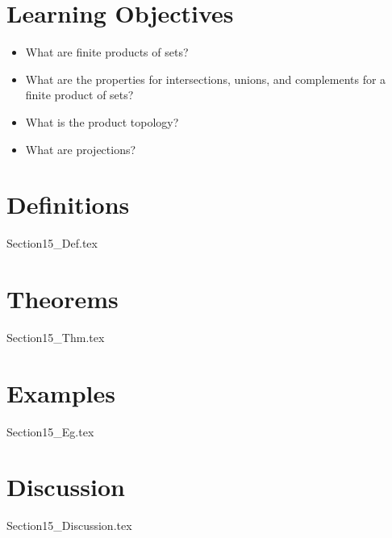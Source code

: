 \section{Learning Objectives}

\begin{itemize}
    \item What are finite products of sets?
    \item What are the properties for intersections, unions, and complements
        for a finite product of sets?
    \item What is the product topology?
    \item What are projections?
\end{itemize}

\section{Definitions}

{Section15_Def.tex}

\section{Theorems}

{Section15_Thm.tex}

\section{Examples}

{Section15_Eg.tex}

\section{Discussion}

{Section15_Discussion.tex}